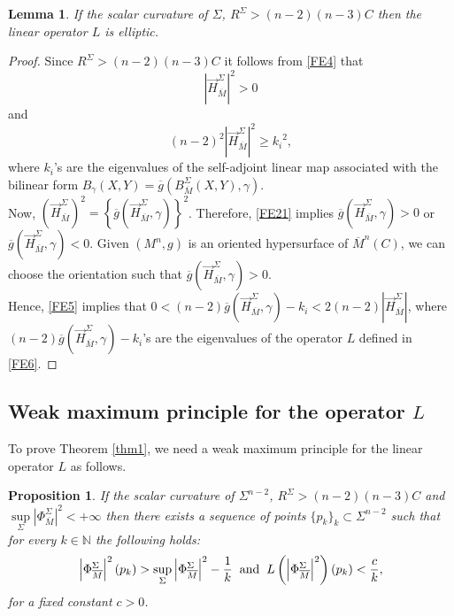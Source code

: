 \documentclass[11pt]{amsart}
\newtheorem{lemma}[theorem]{Lemma}
\newtheorem{proposition}[theorem]{Proposition}
\numberwithin{equation}{section}
\begin{document}
\begin{lemma}\label{lemma3}
    If the scalar curvature of $\Sigma$, $R^{\Sigma}>(n-2)(n-3) C$ then the linear operator $L$ is elliptic.
\end{lemma}
\begin{proof}
    Since $R^{\Sigma}>(n-2)(n-3) C$ it follows from \eqref{FE4} that 
    \begin{equation}\label{FE21}
        \left|\vec{H}^{\Sigma}_{\overline{M}}\right|^2>0
    \end{equation}and
    \begin{equation} \label{FE5}
        (n-2)^2\left|\vec{H}^{\Sigma}_{\overline{M}}\right|^2\ge {k_i}^2,
    \end{equation}
    where $k_i$'s are the eigenvalues of the self-adjoint linear map associated with the bilinear form $B_{\gamma}(X, Y)= \overline{g}\left(B^{\Sigma}_{\overline{M}}(X, Y), \gamma\right)$.\\
    Now, $\left(\vec{H}^{\Sigma}_{\overline{M}}\right)^2=\left\{\overline{g}\left(\vec{H}^{\Sigma}_{\overline{M}}, \gamma \right)\right\}^2$. Therefore, \eqref{FE21} implies $\overline{g}\left(\vec{H}^{\Sigma}_{\overline{M}}, \gamma \right)>0$ or $\overline{g}\left(\vec{H}^{\Sigma}_{\overline{M}}, \gamma \right)<0$. Given $(M^n, g)$ is an oriented hypersurface of $\overline{M}^n(C)$, we can choose the orientation such that $\overline{g}\left(\vec{H}^{\Sigma}_{\overline{M}}, \gamma \right)>0$.\\
    Hence, \eqref{FE5} implies that $0<(n-2)\overline{g}\left(\vec{H}^{\Sigma}_{\overline{M}}, \gamma \right)-k_i<2(n-2)\left|\vec{H}^{\Sigma}_{\overline{M}}\right|$, where $(n-2)\overline{g}\left(\vec{H}^{\Sigma}_{\overline{M}}, \gamma \right)-k_i$'s are the eigenvalues of the operator $L$ defined in \eqref{FE6}.
\end{proof}
 \subsection{Weak maximum principle for the operator $L$}
To prove Theorem \ref{thm1}, we need a weak maximum principle for the linear operator $L$ as follows.
\begin{proposition}\label{prop1}
      If the scalar curvature of $\Sigma^{n-2}$, $R^{\Sigma}>(n-2)(n-3) C$ and $\sup\limits_{\Sigma}\left|\Phi^{\Sigma}_{\overline{M}}\right|^2<+\infty$ then there exists a sequence of points $\{p_k\}_{k}\subset \Sigma^{n-2}$ such that for every $k\in \mathbb{N}$ the following holds:
      \begin{equation}
          \left|\Phi^{\Sigma}_{\overline{M}}\right|^2(p_k)>\sup_{\Sigma} \left|\Phi^{\Sigma}_{\overline{M}}\right|^2-\frac{1}{k} \hspace{2mm} \text{and} \hspace{2mm} L\left(\left|\Phi^{\Sigma}_{\overline{M}}\right|^2\right)(p_k)<\frac{c}{k},
      \end{equation}
      for a fixed constant $c>0$.
\end{proposition}
\end{document}
